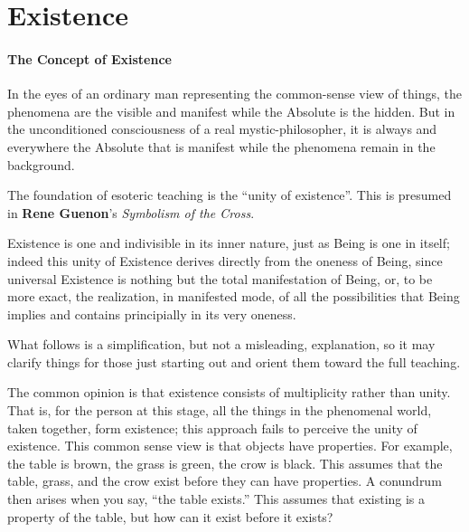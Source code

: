 \section{Existence}

\paragraph{The Concept of Existence}
\begin{quotex}
In the eyes of an ordinary man representing the common-sense view of things, the phenomena are the visible and manifest while the Absolute is the hidden. But in the unconditioned consciousness of a real mystic-philosopher, it is always and everywhere the Absolute that is manifest while the phenomena remain in the background. 

\end{quotex}
The foundation of esoteric teaching is the “unity of existence”. This is presumed in \textbf{Rene Guenon}'s \emph{Symbolism of the Cross}.

\begin{quotex}
Existence is one and indivisible in its inner nature, just as Being is one in itself; indeed this unity of Existence derives directly from the oneness of Being, since universal Existence is nothing but the total manifestation of Being, or, to be more exact, the realization, in manifested mode, of all the possibilities that Being implies and contains principially in its very oneness.

\end{quotex}
What follows is a simplification, but not a misleading, explanation, so it may clarify things for those just starting out and orient them toward the full teaching.

The common opinion is that existence consists of multiplicity rather than unity. That is, for the person at this stage, all the things in the phenomenal world, taken together, form existence; this approach fails to perceive the unity of existence. This common sense view is that objects have properties. For example, the table is brown, the grass is green, the crow is black. This assumes that the table, grass, and the crow exist before they can have properties. A conundrum then arises when you say, “the table exists.” This assumes that existing is a property of the table, but how can it exist before it exists?

